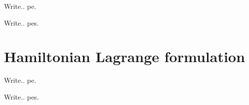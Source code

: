 Write.. \gls{pe}.

Write.. \glspl{pe}.

\section{Hamiltonian Lagrange formulation}
\label{Hamiltonian Lagrange formulation}

Write.. \gls{pe}.

Write.. \glspl{pe}.

%
%
%
%
%
